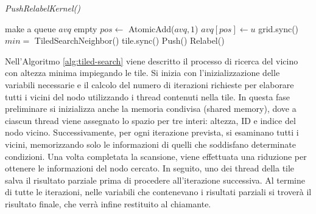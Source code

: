             \begin{algorithm}
                \caption{\textit{PushRelabelKernel()}}\label{alg:workbalanced}
                \begin{algorithmic}
                    \State make a queue $avq$ empty
                    \State {}
                            \State $pos \gets$ AtomicAdd($avq, 1$)
                            \State $avq[pos] \gets u$  
                        \EndIf
                    \EndFor
                    \State grid.sync()
                    \State {}
                        \State {}
                            \State $min =$ TiledSearchNeighbor()
                        \EndFor
                        \State tile.sync()
                        \State {}
                                \State Push()
                            \Else
                                \State Relabel()
                            \EndIf
                        \EndIf
                    \EndFor
                \end{algorithmic}
            \end{algorithm}

            Nell'Algoritmo \ref{alg:tiled-search} viene descritto il processo di ricerca del vicino con altezza minima impiegando le tile. Si inizia con l'inizializzazione delle variabili necessarie e il calcolo del numero di iterazioni richieste per elaborare tutti i vicini del nodo utilizzando i thread contenuti nella tile. In questa fase preliminare si inizializza anche la memoria condivisa (shared memory), dove a ciascun thread viene assegnato lo spazio per tre interi: altezza, ID e indice del nodo vicino. Successivamente, per ogni iterazione prevista, si esaminano tutti i vicini, memorizzando solo le informazioni di quelli che soddisfano determinate condizioni.
            Una volta completata la scansione, viene effettuata una riduzione per ottenere le informazioni del nodo cercato. In seguito, uno dei thread della tile salva il risultato parziale prima di procedere all'iterazione successiva. Al termine di tutte le iterazioni, nelle variabili che contenevano i risultati parziali si troverà il risultato finale, che verrà infine restituito al chiamante.


